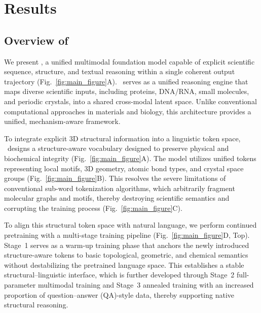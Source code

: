 \section{Results}\label{sec2}
\subsection{Overview of \projName}

We present \projName, a unified multimodal foundation model capable of explicit scientific sequence, structure, and textual reasoning within a single coherent output trajectory (Fig.~\ref{fig:main_figure}A). \projName~serves as a unified reasoning engine that maps diverse scientific inputs, including proteins, DNA/RNA, small molecules, and periodic crystals, into a shared cross-modal latent space. Unlike conventional computational approaches in materials and biology, this architecture provides a unified, mechanism-aware framework. 

To integrate explicit 3D structural information into a linguistic token space, \projName~designs a structure-aware vocabulary designed to preserve physical and biochemical integrity (Fig.~\ref{fig:main_figure}A). The model utilizes unified tokens representing local motifs, 3D geometry, atomic bond types, and crystal space groups (Fig.~\ref{fig:main_figure}B). This resolves the severe limitations of conventional sub-word tokenization algorithms, which arbitrarily fragment molecular graphs and motifs, thereby destroying scientific semantics and corrupting the training process (Fig.~\ref{fig:main_figure}C). 


To align this structural token space with natural language, we perform continued pretraining with a multi-stage training pipeline (Fig.~\ref{fig:main_figure}D, Top). 
Stage~1 serves as a warm-up training phase that anchors the newly introduced structure-aware tokens to basic topological, geometric, and chemical semantics without destabilizing the pretrained language space. 
This establishes a stable structural--linguistic interface, which is further developed through Stage~2 full-parameter multimodal training and Stage~3 annealed training with an increased proportion of question--answer (QA)-style data, thereby supporting native structural reasoning. 

